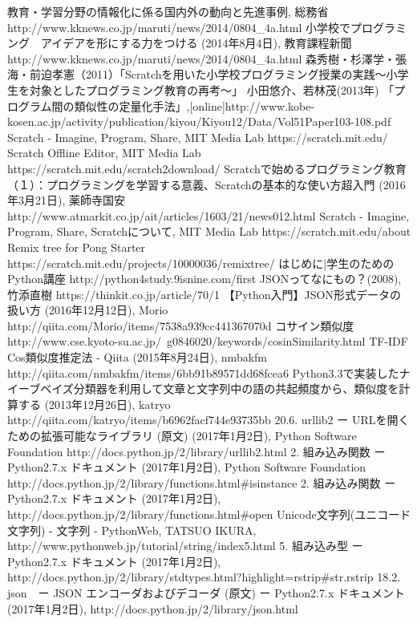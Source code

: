 \documentclass[a4paper,10pt,onecolumn,oneside,openany]{jsbook}
\begin{document}
\begin{thebibliography}{21}

教育・学習分野の情報化に係る国内外の動向と先進事例, 総務省 http://www.kknews.co.jp/maruti/news/2014/0804\_4a.html
小学校でプログラミング　アイデアを形にする力をつける (2014年8月4日), 教育課程新聞 http://www.kknews.co.jp/maruti/news/2014/0804\_4a.html
森秀樹・杉澤学・張海・前迫孝憲（2011）「Scratchを用いた小学校プログラミング授業の実践〜小学生を対象としたプログラミング教育の再考〜」
小田悠介、若林茂(2013年) 「プログラム間の類似性の定量化手法」,[online]http://www.kobe-kosen.ac.jp/activity/publication/kiyou/Kiyou12/Data/Vol51Paper103-108.pdf
Scratch - Imagine, Program, Share, MIT Media Lab https://scratch.mit.edu/
Scratch Offline Editor, MIT Media Lab https://scratch.mit.edu/scratch2download/
Scratchで始めるプログラミング教育（１）：プログラミングを学習する意義、Scratchの基本的な使い方超入門 (2016年3月21日), 薬師寺国安 http://www.atmarkit.co.jp/ait/articles/1603/21/news012.html
Scratch - Imagine, Program, Share, Scratchについて, MIT Media Lab https://scratch.mit.edu/about
Remix tree for Pong Starter https://scratch.mit.edu/projects/10000036/remixtree/
はじめに|学生のためのPython講座 http://python4study.9isnine.com/first
JSONってなにもの？(2008), 竹添直樹 https://thinkit.co.jp/article/70/1
【Python入門】JSON形式データの扱い方 (2016年12月12日), Morio http://qiita.com/Morio/items/7538a939cc441367070d
 コサイン類似度 http://www.cse.kyoto-su.ac.jp/~g0846020/keywords/cosinSimilarity.html
 TF-IDF Cos類似度推定法 - Qiita (2015年8月24日), nmbakfm http://qiita.com/nmbakfm/items/6bb91b89571dd68fcea6
 Python3.3で実装したナイーブベイズ分類器を利用して文章と文字列中の語の共起頻度から、類似度を計算する (2013年12月26日), katryo http://qiita.com/katryo/items/b6962facf744e93735bb
 20.6. urllib2 ー URLを開くための拡張可能なライブラリ (原文) (2017年1月2日), Python Software Foundation http://docs.python.jp/2/library/urllib2.html
 2. 組み込み関数 ー Python2.7.x ドキュメント (2017年1月2日), Python Software Foundation http://docs.python.jp/2/library/functions.html\#isinstance
 2. 組み込み関数 ー Python2.7.x ドキュメント (2017年1月2日), http://docs.python.jp/2/library/functions.html\#open
 Unicode文字列(ユニコード文字列) - 文字列 - PythonWeb, TATSUO IKURA, http://www.pythonweb.jp/tutorial/string/index5.html
 5. 組み込み型 ー Python2.7.x ドキュメント (2017年1月2日), http://docs.python.jp/2/library/stdtypes.html?highlight=rstrip\#str.rstrip
 18.2. json　ー JSON エンコーダおよびデコーダ (原文) ー Python2.7.x ドキュメント (2017年1月2日), http://docs.python.jp/2/library/json.html




\end{thebibliography}
\end{document}
